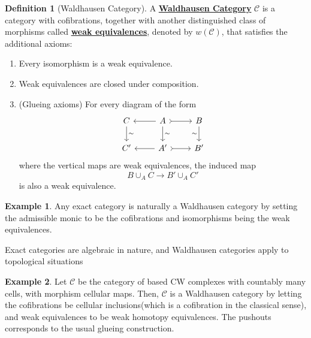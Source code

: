 \documentclass{article}
\theoremstyle{definition}
\theoremstyle{definition}
\newtheorem{definition}{Definition}[theorem]
\theoremstyle{definition}
\theoremstyle{definition}
\theoremstyle{definition}
\theoremstyle{definition}
\theoremstyle{definition}
\newtheorem{example}{Example}[theorem]
\begin{document}
\begin{tcolorbox}[colback=purple!5!white,colframe=purple!75!black]
\begin{definition}[Waldhausen Category]
A \underline{\textbf{Waldhausen Category}} $\mathcal{C}$ is a category with cofibrations, together with another distinguished class of morphisms called \underline{\textbf{weak equivalences}}, denoted by $w(\mathcal{C})$, that satisfies the additional axioms:
\begin{enumerate}
    \item Every isomorphism is a weak equivalence.
    \item Weak equivalences are closed under composition. 
    \item (Glueing axioms) For every diagram of the form
    \[\begin{tikzcd}
        C & A & B \\
        {C'} & {A'} & {B'}
        \arrow["\sim", from=1-1, to=2-1]
        \arrow[from=1-2, to=1-1]
        \arrow[tail, from=1-2, to=1-3]
        \arrow["\sim", from=1-2, to=2-2]
        \arrow["\sim"', from=1-3, to=2-3]
        \arrow[from=2-2, to=2-1]
        \arrow[tail, from=2-2, to=2-3]
    \end{tikzcd}\]
    where the vertical maps are weak equivalences, the induced map 
    \[B\cup_A C\to B'\cup_AC'\]
is also a weak equivalence. 

\end{enumerate}
\end{definition}
\end{tcolorbox}



\begin{tcolorbox}[colback=yellow!5!white,colframe=yellow!30!white]
    \begin{example}
    Any exact category is naturally a Waldhausen category by setting the admissible monic to be the cofibrations and isomorphisms being the weak equivalences. 
    \end{example}
    \end{tcolorbox}

Exact categories are algebraic in nature, and Waldhausen categories apply to topological situations
\begin{tcolorbox}[colback=yellow!5!white,colframe=yellow!30!white]
\begin{example}
Let $\mathcal{C}$ be the category of based CW complexes with countably many cells, with morphism cellular maps. Then, $\mathcal{C}$ is a Waldhausen category by letting the cofibrations be cellular inclusions(which is a cofibration in the classical sense), and weak equivalences to be weak homotopy equivalences. The pushouts corresponds to the usual glueing construction. 
\end{example}
\end{tcolorbox}
\end{document}

